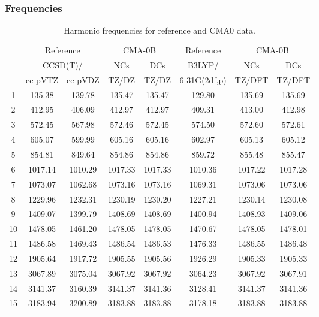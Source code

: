 \documentclass[10pt,oneside]{article}
\begin{document}
\clearpage

\subsubsection*{Frequencies}
\begin{table}[h!]
\centering
\caption{Harmonic frequencies for reference and CMA0 data.}
\begin{tabular}{cccccccc}
\toprule
{} & \multicolumn{2}{c}{Reference} & \multicolumn{2}{c}{CMA-0B} &    Reference & \multicolumn{2}{c}{CMA-0B} \\
{} & \multicolumn{2}{c}{CCSD(T)/} &     NCs &     DCs &       B3LYP/ &     NCs &     DCs \\
{} &   cc-pVTZ & cc-pVDZ &   TZ/DZ &   TZ/DZ & 6-31G(2df,p) &  TZ/DFT &  TZ/DFT \\
\midrule
1  &    135.38 &  139.78 &  135.47 &  135.47 &       129.80 &  135.69 &  135.69 \\
2  &    412.95 &  406.09 &  412.97 &  412.97 &       409.31 &  413.00 &  412.98 \\
3  &    572.45 &  567.98 &  572.46 &  572.45 &       574.50 &  572.60 &  572.61 \\
4  &    605.07 &  599.99 &  605.16 &  605.16 &       602.97 &  605.13 &  605.12 \\
5  &    854.81 &  849.64 &  854.86 &  854.86 &       859.72 &  855.48 &  855.47 \\
6  &   1017.14 & 1010.29 & 1017.33 & 1017.33 &      1010.36 & 1017.22 & 1017.28 \\
7  &   1073.07 & 1062.68 & 1073.16 & 1073.16 &      1069.31 & 1073.06 & 1073.06 \\
8  &   1229.96 & 1232.31 & 1230.19 & 1230.20 &      1227.21 & 1230.14 & 1230.08 \\
9  &   1409.07 & 1399.79 & 1408.69 & 1408.69 &      1400.94 & 1408.93 & 1409.06 \\
10 &   1478.05 & 1461.20 & 1478.05 & 1478.05 &      1470.67 & 1478.05 & 1478.01 \\
11 &   1486.58 & 1469.43 & 1486.54 & 1486.53 &      1476.33 & 1486.55 & 1486.48 \\
12 &   1905.64 & 1917.72 & 1905.55 & 1905.56 &      1926.29 & 1905.33 & 1905.33 \\
13 &   3067.89 & 3075.04 & 3067.92 & 3067.92 &      3064.23 & 3067.92 & 3067.91 \\
14 &   3141.37 & 3160.39 & 3141.37 & 3141.36 &      3128.41 & 3141.37 & 3141.36 \\
15 &   3183.94 & 3200.89 & 3183.88 & 3183.88 &      3178.18 & 3183.88 & 3183.88 \\
\bottomrule
\end{tabular}
\end{table}
\end{document}
